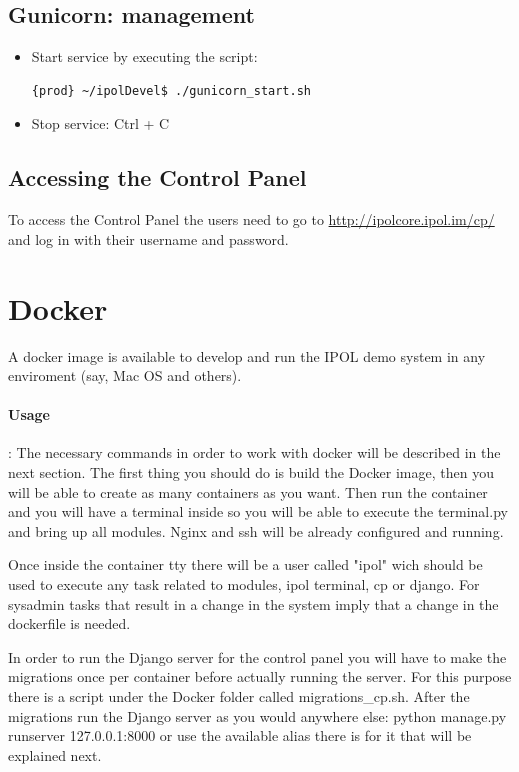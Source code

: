 \documentclass[a4paper,12pt]{article}
\begin{document}
\subsection{Gunicorn: management}
\begin{itemize}
    \item Start service by executing the script:
    \begin{lstlisting}[language=Bash]
    {prod} ~/ipolDevel$ ./gunicorn_start.sh
    \end{lstlisting}

    \item Stop service: Ctrl + C
\end{itemize}



\subsection{Accessing the Control Panel}
To access the Control Panel the users need to go to \url{http://ipolcore.ipol.im/cp/} and log in with their username and password.

\section{Docker}
A docker image is available to develop and run the IPOL demo system in any enviroment (say, Mac OS and others).

\paragraph{Usage}:
The necessary commands in order to work with docker will be described in the next section. The first thing you should do is
build the Docker image, then you will be able to create as many containers as you want. Then run the container and you
will have a terminal inside so you will be able to execute the terminal.py and bring up all modules. Nginx and ssh will be already
configured and running.

Once inside the container tty there will be a user called "ipol" wich should be used to execute any task related to modules, ipol terminal, 
cp or django. For sysadmin tasks that result in a change in the system imply that a change in the dockerfile is needed.
 
In order to run the Django server for the control panel you will have to make the migrations once per
container before actually running the server. For this purpose there is a script under the Docker folder called migrations\_cp.sh.
 After the migrations run the Django server as you would anywhere else: python manage.py runserver 127.0.0.1:8000 or use the available 
 alias there is for it that will be explained next.
 
\end{document}
